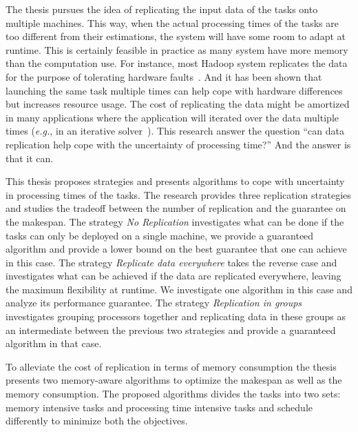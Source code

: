 \documentclass[12pt]{article}
\theoremstyle{mystyle}
\begin{document}
 The thesis pursues the idea of replicating the input data
 of the tasks onto multiple machines. This way, when the actual
 processing times of the tasks are too different from their
 estimations, the system will have some room to adapt at runtime. This
 is certainly feasible in practice as many system have more memory than
 the computation use. For instance, most Hadoop system replicates the
 data for the purpose of tolerating hardware
 faults~\cite{White:2009:HDG:1717298}. And it has been shown that
 launching the same task multiple times can help cope with hardware
 differences~\cite{DBLP:journals/corr/WangJW14} but increases resource
 usage. The cost of replicating the data might be amortized in many
 applications where the application will iterated over the data
 multiple times ({\em e.g.}, in an iterative solver~\cite{Zhou12-P2S2,Zhou12-Cluster}). This research 
 answer the question ``can data replication help cope with the
 uncertainty of processing time?''  And the answer is that it can.
 
 \label{ch1-Contribution}
  This thesis proposes strategies and presents algorithms to cope with uncertainty in processing times of the tasks. The research provides three  replication strategies and studies the tradeoff between the number of replication and the guarantee on the makespan. The strategy \textit{No Replication} investigates what can be
   done if the tasks can only be deployed on a single machine, we
   provide a guaranteed algorithm and provide a lower bound on the best
   guarantee that one can achieve in this case. The strategy \textit{Replicate data everywhere} takes
   the reverse case and investigates what can be achieved if the data are
   replicated everywhere, leaving the maximum flexibility at runtime. We
   investigate one algorithm in this case and analyze its performance
   guarantee. The strategy \textit{Replication in groups} investigates grouping processors
   together and replicating data in these groups as an intermediate
   between the previous two strategies and provide a guaranteed algorithm
   in that case.

To alleviate the cost of replication in terms of memory consumption the thesis  presents two memory-aware algorithms to optimize the makespan as well as the memory consumption. The proposed algorithms divides the tasks into two sets: memory intensive tasks and processing time intensive tasks and schedule differently to minimize both the objectives.    
   
 
 \label{ch1-Outline}
 
\end{document}
